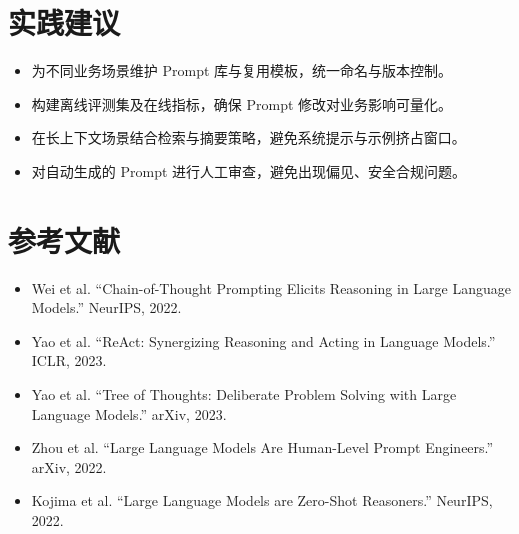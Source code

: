 \documentclass[UTF8,zihao=-4]{ctexart}
\begin{document}
\section*{实践建议}
\begin{itemize}
  \item 为不同业务场景维护 Prompt 库与复用模板，统一命名与版本控制。
  \item 构建离线评测集及在线指标，确保 Prompt 修改对业务影响可量化。
  \item 在长上下文场景结合检索与摘要策略，避免系统提示与示例挤占窗口。
  \item 对自动生成的 Prompt 进行人工审查，避免出现偏见、安全合规问题。
\end{itemize}

\section*{参考文献}
\begin{itemize}
  \item Wei et al. ``Chain-of-Thought Prompting Elicits Reasoning in Large Language Models.'' NeurIPS, 2022.
  \item Yao et al. ``ReAct: Synergizing Reasoning and Acting in Language Models.'' ICLR, 2023.
  \item Yao et al. ``Tree of Thoughts: Deliberate Problem Solving with Large Language Models.'' arXiv, 2023.
  \item Zhou et al. ``Large Language Models Are Human-Level Prompt Engineers.'' arXiv, 2022.
  \item Kojima et al. ``Large Language Models are Zero-Shot Reasoners.'' NeurIPS, 2022.
\end{itemize}
\end{document}
